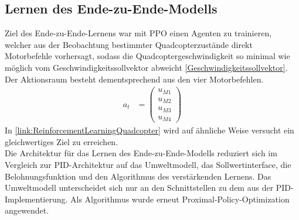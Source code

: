 \subsection{\label{EndeZuEndeModell}Lernen des Ende-zu-Ende-Modells}
Ziel des Ende-zu-Ende-Lernens war mit PPO einen Agenten zu trainieren, welcher aus der Beobachtung bestimmter Quadcopterzustände direkt Motorbefehle vorhersagt, sodass die Quadcoptergeschwindigkeit so minimal wie möglich vom Geschwindigkeitssollvektor abweicht \ref{Geschwindigkeitssollvektor}. Der Aktionsraum besteht dementsprechend aus den vier Motorbefehlen.
\begin{align}
a_t &= 
\begin{pmatrix}
	u_{M1}\\
	u_{M2}\\
	u_{M3}\\
	u_{M4}
\end{pmatrix}
\end{align}
In \ref{link:ReinforcementLearningQuadcopter} wird auf ähnliche Weise versucht ein gleichwertiges Ziel zu erreichen.\\
Die Architektur für das Lernen des Ende-zu-Ende-Modells reduziert sich im Vergleich zur PID-Architektur auf das Umweltmodell, das Sollwertinterface, die Belohnungsfunktion und den Algorithmus des verstärkenden Lernens. Das Umweltmodell unterscheidet sich nur an den Schnittstellen zu dem aus der PID-Implementierung. Als Algorithmus wurde erneut Proximal-Policy-Optimization angewendet.
\begin{center}
\end{center}
